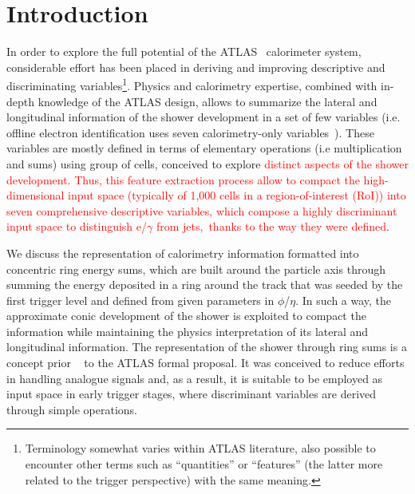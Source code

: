 \section{Introduction}



In order to explore the full potential of the ATLAS~\cite{PERF-2007-01}
calorimeter system, considerable effort has been placed in deriving and
improving descriptive and discriminating variables\footnote{Terminology somewhat
  varies within ATLAS literature, also possible to encounter other terms such
as ``quantities'' or ``features'' (the latter more related to the trigger
perspective) with the same meaning.}. Physics and calorimetry expertise,
combined with in-depth knowledge of the ATLAS design, allows to summarize the
lateral and longitudinal information of the shower development in a set of few
variables (i.e. offline electron identification uses seven calorimetry-only
variables~\cite{aaboud2019electron}). These variables are mostly defined in
terms of elementary operations (i.e multiplication and sums) using group of cells, conceived to explore
\textcolor{red}{distinct aspects of the shower development. Thus, this feature extraction process allow to
compact the high-dimensional input space (typically of 1,000 cells in a region-of-interest (RoI)) into seven comprehensive descriptive variables, which compose a highly discriminant input space to distinguish e/$\gamma$ from jets, thanks to the way they were defined}.


We discuss the representation of calorimetry information formatted into concentric ring energy sums, which are built around the particle axis through summing the energy deposited in a ring around the track that was seeded by the first trigger level and defined from given parameters in $\phi$/$\eta$. In such a way, the approximate conic development of the shower is exploited to compact the information while maintaining the physics interpretation of its lateral and longitudinal information. The representation of the shower through ring sums is a concept prior ~\cite{1992_spacal_rings} to the ATLAS formal proposal. It was conceived to reduce efforts in handling analogue signals and, as a result, it is suitable to be employed as input space in early trigger stages, where discriminant variables are derived through simple operations.


